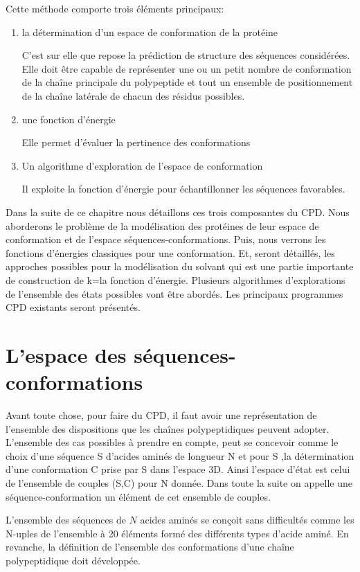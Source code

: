 Cette méthode comporte trois éléments principaux:
\begin{enumerate}
\item la détermination d'un espace de conformation de la protéine
  
  C'est sur elle que repose la prédiction de structure des séquences considérées. Elle doit être capable de représenter une ou un petit nombre de conformation de la chaîne principale du polypeptide et tout un ensemble de positionnement de la chaîne latérale de chacun des résidus possibles.
\item une fonction d'énergie

  Elle permet d'évaluer la pertinence des conformations 
\item Un algorithme d'exploration de l'espace de conformation

  Il exploite la fonction d'énergie pour échantillonner les séquences favorables.
  
\end{enumerate}

Dans la suite de ce chapitre nous détaillons ces trois composantes du CPD. Nous aborderons le problème de la modélisation des protéines de leur espace de conformation et de l'espace séquences-conformations. Puis, nous verrons les fonctions d'énergies classiques pour une conformation. Et, seront détaillés, les approches possibles pour la modélisation du solvant qui est une partie importante de construction de k=la fonction d'énergie. Plusieurs algorithmes d'explorations de l'ensemble des états possibles vont être abordés. Les principaux programmes CPD existants seront présentés.   


\section{L'espace des séquences-conformations}
Avant toute chose, pour faire du CPD, il faut avoir une représentation de l'ensemble des dispositions que les chaînes polypeptidiques peuvent adopter. L'ensemble des cas possibles à prendre en compte, peut se concevoir comme le choix d'une séquence S d'acides aminés de longueur N  et pour S ,la détermination d'une conformation C prise par S dans l'espace 3D. Ainsi l'espace d'état est celui de l'ensemble de couples (S,C) pour N donnée. Dans toute la suite on appelle une séquence-conformation un élément de cet ensemble de couples.   

L'ensemble des séquences de $N$ acides aminés se conçoit sans difficultés comme les N-uples de l'ensemble à 20 éléments formé des différents types d'acide aminé. En revanche, la définition de l'ensemble des conformations d'une chaîne polypeptidique doit développée.

